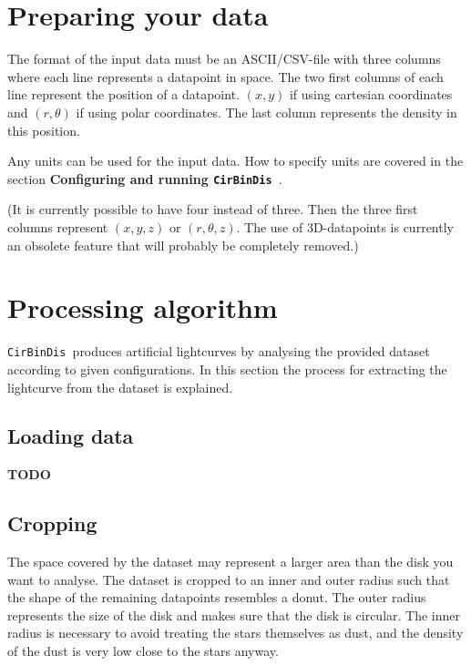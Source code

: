 \documentclass[a4paper, 12pt, english, titlepage]{article}
\newcommand{\sname}{\texttt{CirBinDis }}
\begin{document}
\section{Preparing your data}

The format of the input data must be an ASCII/CSV-file with three columns where each line represents a datapoint in space. The two first columns of each line represent the position of a datapoint. $(x, y)$ if using cartesian coordinates and $(r, \theta)$ if using polar coordinates. The last column represents the density in this position.

Any units can be used for the input data. How to specify units are covered in the section \textbf{Configuring and running \sname}.

(It is currently possible to have four instead of three. Then the three first columns represent $(x, y, z)$ or $(r, \theta, z)$. The use of 3D-datapoints is currently an obsolete feature that will probably be completely removed.)


\section{Processing algorithm}

\sname produces artificial lightcurves by analysing the provided dataset according to given configurations. In this section the process for extracting the lightcurve from the dataset is explained.

\subsection{Loading data}
    \textbf{TODO}

\subsection{Cropping}
    The space covered by the dataset may represent a larger area than the disk you want to analyse. The dataset is cropped to an inner and outer radius such that the shape of the remaining datapoints resembles a donut. The outer radius represents the size of the disk and makes sure that the disk is circular. The inner radius is necessary to avoid treating the stars themselves as dust, and the density of the dust is very low close to the stars anyway.
\end{document}

